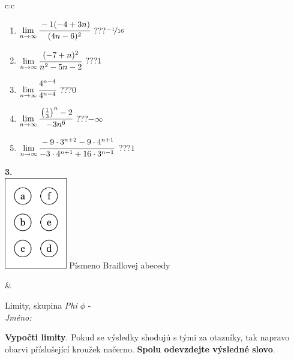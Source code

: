 \documentclass[10pt]{report}
\begin{document}
\begin{tabular}{c:c}
\begin{minipage}[c][104.5mm][t]{0.5\linewidth}
\begin{center}
\begin{minipage}{0.79\linewidth}
\begin{center}
\begin{varwidth}{\linewidth}
\begin{enumerate}
\item $\lim\limits_{n\to\infty}\cfrac{-1(-4+3n)}{(4n-6)^2}$\quad \dotfill\; ???\;\dotfill \quad $\nicefrac{-1}{16}$
\item $\lim\limits_{n\to\infty}\cfrac{(-7+n)^2}{n^2-5n-2}$\quad \dotfill\; ???\;\dotfill \quad $1$
\item $\lim\limits_{n\to\infty}\cfrac{4^{n-4}}{4^{n-4}}$\quad \dotfill\; ???\;\dotfill \quad $0$
\item $\lim\limits_{n\to\infty}\cfrac{\left(\frac{1}{3}\right)^n -2}{-3n^{6}}$\quad \dotfill\; ???\;\dotfill \quad $-\infty$
\item $\lim\limits_{n\to\infty}\cfrac{-9\cdot 3^{n+2}-9\cdot 4^{n+1}}{-3\cdot 4^{n+1}+16\cdot 3^{n-1}}$\quad \dotfill\; ???\;\dotfill \quad $1$
\end{enumerate}
\end{varwidth}
\end{center}
\end{minipage}
\begin{minipage}{0.20\linewidth}
\begin{center}
{\Huge\bfseries 3.} \\[2mm]
\includegraphics[height=40mm]{../images/braille.png}
{\small Písmeno Braillovej abecedy}
\end{center}
\end{minipage}
\end{center}
\end{minipage}
&
\begin{minipage}[c][104.5mm][t]{0.5\linewidth}
\begin{center}
\vspace{7mm}
{\huge Limity, skupina \textit{Phi $\phi$} -}\\[5mm]
\textit{Jméno:}\phantom{xxxxxxxxxxxxxxxxxxxxxxxxxxxxxxxxxxxxxxxxxxxxxxxxxxxxxxxxxxxxxxxxx}\\[5mm]
\begin{minipage}{0.95\linewidth}
\begin{center}
\textbf{Vypočti limity}. Pokud se výsledky shodujú s tými za otazníky, tak napravo\\obarvi příslušející kroužek načerno. \textbf{Spolu odevzdejte výsledné slovo}.

\end{center}
\end{minipage}
\end{center}
\end{minipage}
\end{tabular}
\end{document}
